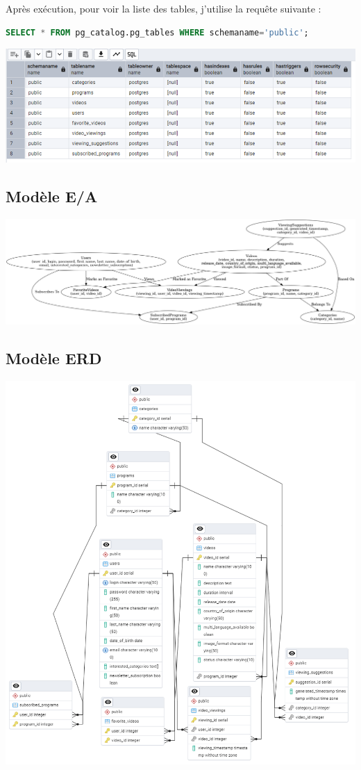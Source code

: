 \documentclass{article}
\begin{document}
Après exécution, pour voir la liste des tables, j'utilise la requête suivante :

\begin{lstlisting}[language=SQL]
SELECT * FROM pg_catalog.pg_tables WHERE schemaname='public';
\end{lstlisting}

\includegraphics[width=\textwidth]{photo1.jpg}

\subsection{Modèle E/A}

\includegraphics[width=\textwidth]{photo2.jpg}

\subsection{Modèle ERD}

\includegraphics[width=\textwidth]{photo3.jpg}
\end{document}
